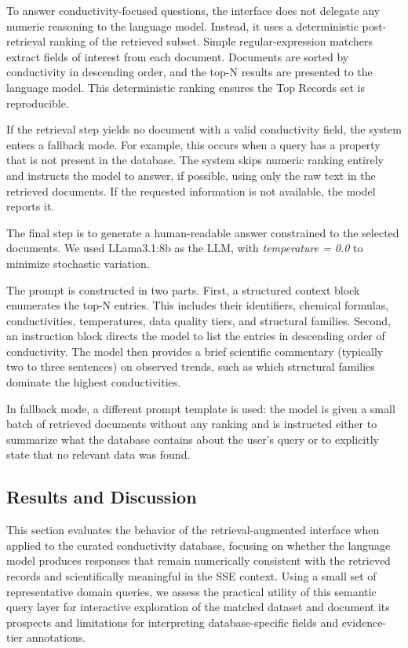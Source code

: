 \documentclass[a4paper,fleqn]{cas-sc}
\begin{document}
To answer conductivity-focused questions, the interface does not delegate any numeric reasoning to the language model. Instead, it uses a deterministic post-retrieval ranking of the retrieved subset. Simple regular-expression matchers extract fields of interest from each document. Documents are sorted by conductivity in descending order, and the top-N results are presented to the language model. This deterministic ranking ensures the Top Records set is reproducible.

If the retrieval step yields no document with a valid conductivity field, the system enters a fallback mode. For example, this occurs when a query has a property that is not present in the database. The system skips numeric ranking entirely and instructs the model to answer, if possible, using only the raw text in the retrieved documents. If the requested information is not available, the model reports it.

The final step is to generate a human-readable answer constrained to the selected documents. We used LLama3.1:8b \cite{grattafiori2024llama3} as the LLM, with \textit{temperature = 0.0} to minimize stochastic variation. 

The prompt is constructed in two parts. First, a structured context block enumerates the top-N entries. This includes their identifiers, chemical formulas, conductivities, temperatures, data quality tiers, and structural families. Second, an instruction block directs the model to list the entries in descending order of conductivity. The model then provides a brief scientific commentary (typically two to three sentences) on observed trends, such as which structural families dominate the highest conductivities. 

In fallback mode, a different prompt template is used: the model is given a small batch of retrieved documents without any ranking and is instructed either to summarize what the database contains about the user's query or to explicitly state that no relevant data was found.




\subsection{Results and Discussion}
This section evaluates the behavior of the retrieval-augmented interface when applied to the curated conductivity database, focusing on whether the language model produces responses that remain numerically consistent with the retrieved records and scientifically meaningful in the SSE context. Using a small set of representative domain queries, we assess the practical utility of this semantic query layer for interactive exploration of the matched dataset and document its prospects and limitations for interpreting database-specific fields and evidence-tier annotations.
\end{document}
